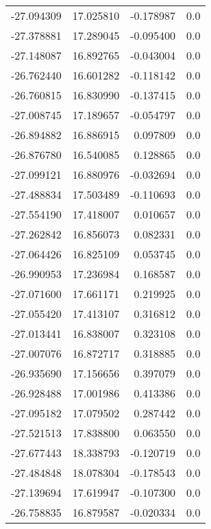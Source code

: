\begin{tabular}{rrrr}
      -27.094309 &        17.025810 &   -0.178987 &   0.0 \\
      -27.378881 &        17.289045 &   -0.095400 &   0.0 \\
      -27.148087 &        16.892765 &   -0.043004 &   0.0 \\
      -26.762440 &        16.601282 &   -0.118142 &   0.0 \\
      -26.760815 &        16.830990 &   -0.137415 &   0.0 \\
      -27.008745 &        17.189657 &   -0.054797 &   0.0 \\
      -26.894882 &        16.886915 &    0.097809 &   0.0 \\
      -26.876780 &        16.540085 &    0.128865 &   0.0 \\
      -27.099121 &        16.880976 &   -0.032694 &   0.0 \\
      -27.488834 &        17.503489 &   -0.110693 &   0.0 \\
      -27.554190 &        17.418007 &    0.010657 &   0.0 \\
      -27.262842 &        16.856073 &    0.082331 &   0.0 \\
      -27.064426 &        16.825109 &    0.053745 &   0.0 \\
      -26.990953 &        17.236984 &    0.168587 &   0.0 \\
      -27.071600 &        17.661171 &    0.219925 &   0.0 \\
      -27.055420 &        17.413107 &    0.316812 &   0.0 \\
      -27.013441 &        16.838007 &    0.323108 &   0.0 \\
      -27.007076 &        16.872717 &    0.318885 &   0.0 \\
      -26.935690 &        17.156656 &    0.397079 &   0.0 \\
      -26.928488 &        17.001986 &    0.413386 &   0.0 \\
      -27.095182 &        17.079502 &    0.287442 &   0.0 \\
      -27.521513 &        17.838800 &    0.063550 &   0.0 \\
      -27.677443 &        18.338793 &   -0.120719 &   0.0 \\
      -27.484848 &        18.078304 &   -0.178543 &   0.0 \\
      -27.139694 &        17.619947 &   -0.107300 &   0.0 \\
      -26.758835 &        16.879587 &   -0.020334 &   0.0 \\

\end{tabular}
